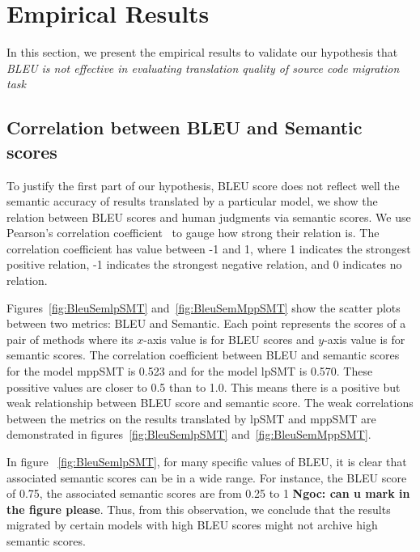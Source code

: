\section{Empirical Results}
\label{sec:bleuresult}

In this section, we present the empirical results to validate our hypothesis that 
\textit{BLEU is not effective in evaluating translation quality of source code migration task}
\subsection{Correlation between BLEU and Semantic scores}
To justify the first part of our hypothesis, BLEU score does not reflect well 
the semantic accuracy of results translated by a particular model, 
we show the relation between BLEU scores and human judgments via semantic scores. 
We use Pearson's correlation coefficient~\cite{PearsonCorrelation} to gauge
how strong their relation is. The correlation coefficient has value
between -1 and 1, where 1 indicates the strongest positive relation, -1
indicates the strongest negative relation, and 0 indicates no relation.

Figures~\ref{fig:BleuSemlpSMT} and~\ref{fig:BleuSemMppSMT} show the
scatter plots between two metrics: BLEU and Semantic. Each point
represents the scores of a pair of methods where its $x$-axis value is
for BLEU scores and $y$-axis value is for semantic scores. The
correlation coefficient between BLEU and semantic scores for the model
mppSMT is 0.523 and for the model lpSMT is 0.570. These possitive values 
are closer to 0.5 than to 1.0. This means there is a positive but weak 
relationship between BLEU score and semantic score. The weak correlations %
between the metrics on the results translated by lpSMT and mppSMT are 
demonstrated in figures~\ref{fig:BleuSemlpSMT} and~\ref{fig:BleuSemMppSMT}.

In figure ~\ref{fig:BleuSemlpSMT}, for many specific values of BLEU, it 
is clear that associated semantic scores can be in a wide range. For 
instance, the BLEU score of 0.75, the associated semantic scores are 
from 0.25 to 1 \textbf{Ngoc: can u mark in the figure please}. Thus, from this 
observation, we conclude that the results migrated by certain models 
with high BLEU scores might not archive high semantic scores. 
%


